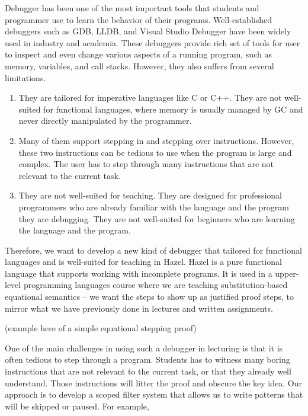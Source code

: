 Debugger has been one of the most important tools that students and programmer
use to learn the behavior of their programs. Well-established debuggers such as
GDB, LLDB, and Visual Studio Debugger have been widely used in industry and
academia. These debuggers provide rich set of tools for user to inspect and even
change various aspects of a running program, such as memory, variables,
and call stacks. However, they also suffers from several limitations.

\begin{enumerate}
  \item They are tailored for imperative languages like C or C++. They are not
    well-suited for functional languages, where memory is usually managed by
    GC and never directly manipulated by the programmer.
  \item Many of them support stepping in and stepping over instructions. However,
    these two instructions can be tedious to use when the program is large and
    complex. The user has to step through many instructions that are not relevant
    to the current task.
  \item They are not well-suited for teaching. They are designed for professional
    programmers who are already familiar with the language and the program they
    are debugging. They are not well-suited for beginners who are learning the
    language and the program.
\end{enumerate}

Therefore, we want to develop a new kind of debugger that tailored for
functional languages and is well-suited for teaching in Hazel. Hazel is a pure
functional language that supports working with incomplete programs. It is used
in a upper-level programming languages course where we are teaching
substitution-based equational semantics -- we want the steps to show up as
justified proof steps, to mirror what we have previously done in lectures and
written assignments.

(example here of a simple equational stepping proof)

One of the main challenges in using such a debugger in lecturing is that it is
often tedious to step through a program. Students has to witness many boring
instructions that are not relevant to the current task, or that they already
well understand. Those instructions will litter the proof and obscure the key
idea. Our approach is to develop a scoped filter system that allows us to write patterns
that will be skipped or paused. For example,

